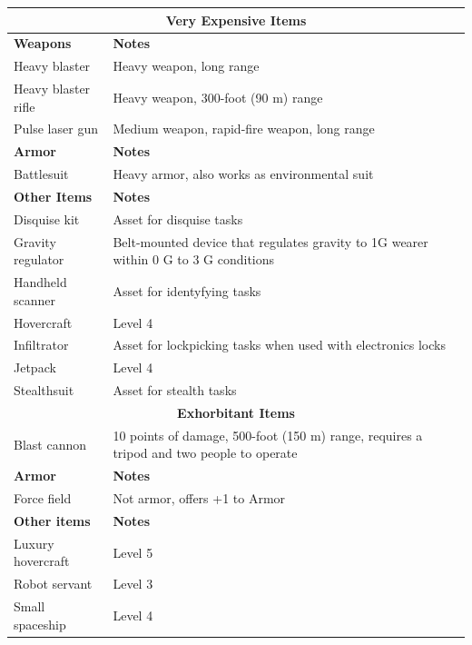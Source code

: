 \begin{longtable}{| p{} | p{} |}
\multicolumn{2}{|c|}{\textbf{Very Expensive Items}} \\ \hline

\textbf{Weapons} & \textbf{Notes} \\ \hline
Heavy blaster & Heavy weapon, long range \\ \hline
Heavy blaster rifle & Heavy weapon, 300-foot (90 m) range \\ \hline
Pulse laser gun & Medium weapon, rapid-fire weapon, long range \\ \hline

\textbf{Armor} & \textbf{Notes} \\ \hline
Battlesuit & Heavy armor, also works as environmental suit \\ \hline

\textbf{Other Items} & \textbf{Notes} \\ \hline
Disquise kit & Asset for disquise tasks \\ \hline
Gravity regulator & Belt-mounted device that regulates gravity to 1G wearer within 0 G to 3 G conditions \\ \hline
Handheld scanner & Asset for identyfying tasks \\ \hline
Hovercraft & Level 4 \\ \hline
Infiltrator & Asset for lockpicking tasks when used with electronics locks \\ \hline
Jetpack & Level 4 \\ \hline
Stealthsuit & Asset for stealth tasks \\ \hline

\multicolumn{2}{|c|}{\textbf{Exhorbitant Items}} \\ \hline

Blast cannon & 10 points of damage, 500-foot (150 m) range, requires a tripod and two people to operate \\ \hline

\textbf{Armor} & \textbf{Notes} \\ \hline

Force field & Not armor, offers +1 to Armor \\ \hline

\textbf{Other items} & \textbf{Notes} \\ \hline

Luxury hovercraft & Level 5 \\ \hline
Robot servant & Level 3 \\ \hline
Small spaceship & Level 4 \\ \hline

\end{longtable}

